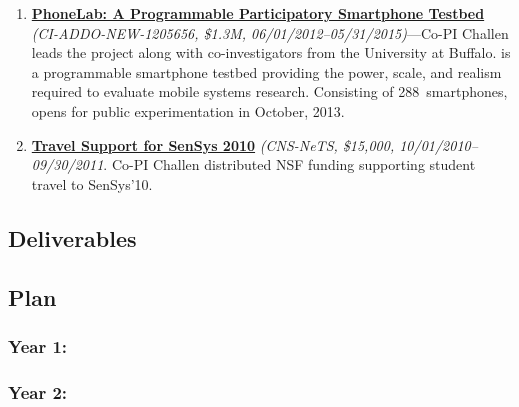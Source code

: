 \begin{enumerate}

\item
\href{http://www.nsf.gov/awardsearch/showAward?AWD\_ID=1205656}{\textbf{PhoneLab:
A Programmable Participatory Smartphone Testbed}}
\textit{(CI-ADDO-NEW-1205656, \$1.3M, 06/01/2012--05/31/2015)}---Co-PI
Challen leads the \PhoneLab{} project along with co-investigators from the
University at Buffalo. \PhoneLab{} is a programmable smartphone testbed
providing the power, scale, and realism required to evaluate mobile systems
research. Consisting of 288~smartphones, \PhoneLab{} opens for public
experimentation in October, 2013.

\item
\href{http://www.nsf.gov/awardsearch/showAward?AWD\_ID=1059586}{\textbf{Travel
Support for SenSys 2010}}
\textit{(CNS-NeTS, \$15,000,
10/01/2010--09/30/2011}. Co-PI Challen distributed NSF funding supporting
student travel to SenSys'10.

\end{enumerate}


\subsection{Deliverables}
\label{subsec-methods}

\subsection{Plan}

\subsubsection{Year 1:\space}

\subsubsection{Year 2:\space}
